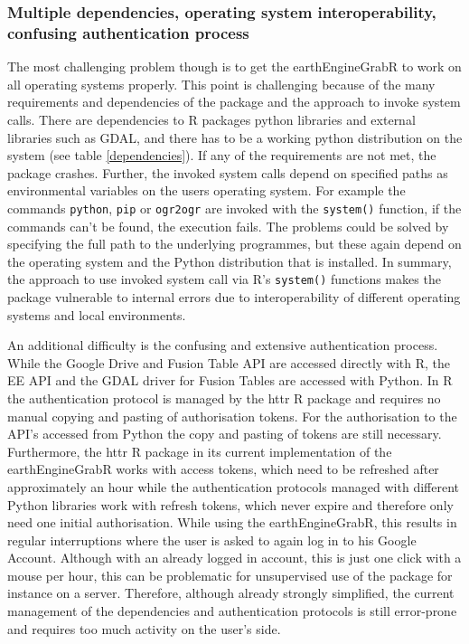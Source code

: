 \subsubsection{Multiple dependencies, operating system interoperability, confusing authentication process}

The most challenging problem though is to get the earthEngineGrabR to work on all operating systems properly. This point is challenging because of the many requirements and dependencies of the package and the approach to invoke system calls. There are dependencies to R packages python libraries and external libraries such as GDAL, and there has to be a working python distribution on the system (see table \ref{dependencies}). If any of the requirements are not met, the package crashes. 
Further, the invoked system calls depend on specified paths as environmental variables on the users operating system. For example the commands \texttt{python}, \texttt{pip} or \texttt{ogr2ogr} are invoked with the \texttt{system()} function, if the commands can't be found, the execution fails. The problems could be solved by specifying the full path to the underlying programmes, but these again depend on the operating system and the Python distribution that is installed. In summary, the approach to use invoked system call via R's \texttt{system()} functions makes the package vulnerable to internal errors due to interoperability of different operating systems and local environments.

An additional difficulty is the confusing and extensive authentication process. While the Google Drive and Fusion Table API are accessed directly with R, the EE API and the GDAL driver for Fusion Tables are accessed with Python. In R the authentication protocol is managed by the httr R package and requires no manual copying and pasting of authorisation tokens. For the authorisation to the API's accessed from Python the copy and pasting of tokens are still necessary. 
Furthermore, the httr R package in its current implementation of the earthEngineGrabR works with access tokens, which need to be refreshed after approximately an hour while the authentication protocols managed with different Python libraries work with refresh tokens, which never expire and therefore only need one initial authorisation. While using the earthEngineGrabR, this results in regular interruptions where the user is asked to again log in to his Google Account. Although with an already logged in account, this is just one click with a mouse per hour, this can be problematic for unsupervised use of the package for instance on a  server. Therefore, although already strongly simplified, the current management of the dependencies and authentication protocols is still error-prone and requires too much activity on the user's side.

